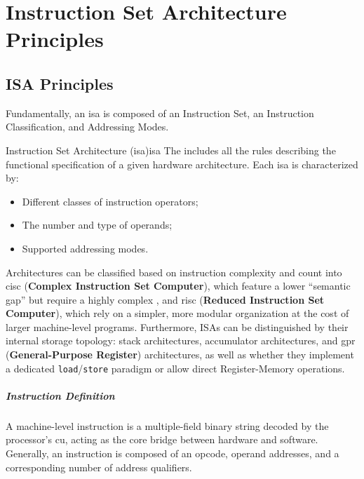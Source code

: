\chapter{Instruction Set Architecture Principles}

\section{ISA Principles}
Fundamentally, an \gls{isa} is composed of an Instruction Set, an Instruction Classification, and Addressing Modes.

\begin{definition}{Instruction Set Architecture (\gls*{isa})}{isa}
    The  includes all the rules describing the functional specification of a given hardware architecture. Each \gls{isa} is characterized by:
    \begin{itemize}
        \item Different classes of instruction operators;
        \item The number and type of operands;
        \item Supported addressing modes.
    \end{itemize}
\end{definition}

\noindent Architectures can be classified based on instruction complexity and count into \gls{cisc} (\textbf{Complex Instruction Set Computer}), which feature a lower ``semantic gap'' but require a highly complex , and \gls{risc} (\textbf{Reduced Instruction Set Computer}), which rely on a simpler, more modular organization at the cost of larger machine-level programs. Furthermore, ISAs can be distinguished by their internal storage topology: stack architectures, accumulator architectures, and \gls{gpr} (\textbf{General-Purpose Register}) architectures, as well as whether they implement a dedicated \texttt{load}/\texttt{store} paradigm or allow direct Register-Memory operations.

\paragraph{Instruction Definition} A machine-level instruction is a multiple-field binary string decoded by the processor's \gls{cu}, acting as the core bridge between hardware and software. Generally, an instruction is composed of an opcode, operand addresses, and a corresponding number of address qualifiers.

